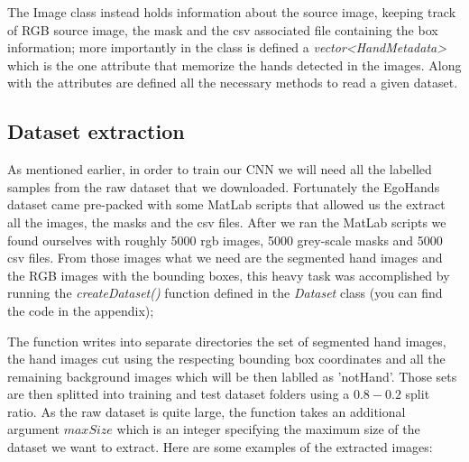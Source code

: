 The Image class instead holds information about the source image, keeping track
of RGB source image, the mask and the csv associated file containing the box
information;
more importantly in the class is defined a \textit{vector<HandMetadata>} which
is the one attribute that memorize the hands detected in the images. Along with
the attributes
are defined all the necessary methods to read a given dataset.

\subsection{Dataset extraction}
As mentioned earlier, in order to train our CNN we will need all the labelled
samples from the raw dataset that we downloaded. Fortunately the EgoHands
dataset came
pre-packed with some MatLab scripts that allowed us the extract all the images,
the masks and the csv files. After we ran the MatLab scripts we found ourselves
with roughly 5000
rgb images, 5000 grey-scale masks and 5000 csv files. From those images what we
need are the segmented hand images and the RGB images with the bounding boxes,
this heavy
task was accomplished by running the \textit{createDataset()} function defined
in the \textit{Dataset} class (you can find the code in the appendix);

The function writes into separate directories the set of segmented hand images,
the hand images cut using the respecting bounding box coordinates and all the
remaining background images
which will be then lablled as 'notHand'. Those sets are then splitted into
training and test dataset folders using a $0.8-0.2$ split ratio. As the raw
dataset is quite large, the function takes
an additional argument $maxSize$ which is an integer specifying the maximum
size of the dataset we want to extract. Here are some examples of the extracted
images:

